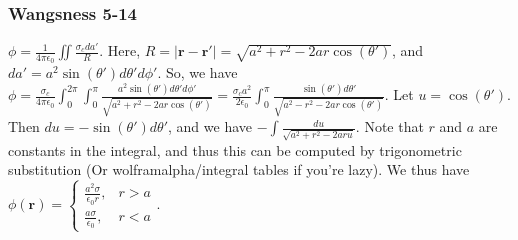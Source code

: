 \documentclass[crop=false,class=article,oneside]{standalone}
\begin{document}
    \subsubsection{Wangsness 5-14}
    $\phi = \frac{1}{4\pi \epsilon_0}\iint \frac{\sigma_c da'}{R}$. Here, $R = |\mathbf{r}-\mathbf{r}'| = \sqrt{a^2+r^2-2ar\cos(\theta')}$, and $da' = a^2\sin(\theta')d\theta'd\phi'$. So, we have $\phi = \frac{\sigma_c}{4\pi \epsilon_0}\int_{0}^{2\pi}\int_{0}^{\pi} \frac{a^2\sin(\theta')d\theta' d\phi'}{\sqrt{a^2+r^2-2ar\cos(\theta')}} = \frac{\sigma_c a^2}{2\epsilon_0}\int_{0}^{\pi} \frac{\sin(\theta')d\theta'}{\sqrt{a^2-r^2-2ar\cos(\theta')}}$. Let $u = \cos(\theta')$. Then $du = -\sin(\theta')d\theta'$, and we have $-\int\frac{du}{\sqrt{a^2+r^2-2aru}}$. Note that $r$ and $a$ are constants in the integral, and thus this can be computed by trigonometric substitution (Or wolframalpha/integral tables if you're lazy). We thus have $\phi(\mathbf{r}) = \begin{cases}\frac{a^2\sigma}{\epsilon_0 r}, & r>a \\ \frac{a\sigma}{\epsilon_0}, & r<a\end{cases}$.
\end{document}
